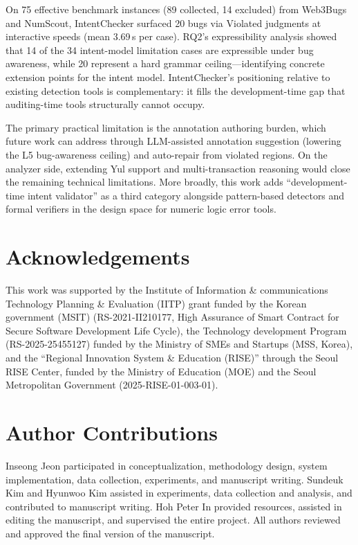 \documentclass[pdflatex,sn-basic]{sn-jnl}%
\theoremstyle{thmstyleone}%
\theoremstyle{thmstyletwo}%
\theoremstyle{thmstylethree}%
\begin{document}
On 75 effective benchmark instances (89 collected, 14 excluded) from Web3Bugs and NumScout, IntentChecker surfaced 20 bugs via Violated judgments at interactive speeds (mean 3.69\,s per case).
RQ2's expressibility analysis showed that 14 of the 34 intent-model limitation cases are expressible under bug awareness, while 20 represent a hard grammar ceiling---identifying concrete extension points for the intent model.
IntentChecker's positioning relative to existing detection tools is complementary: it fills the development-time gap that auditing-time tools structurally cannot occupy.

The primary practical limitation is the annotation authoring burden, which future work can address through LLM-assisted annotation suggestion (lowering the L5 bug-awareness ceiling) and auto-repair from violated regions.
On the analyzer side, extending Yul support and multi-transaction reasoning would close the remaining technical limitations.
More broadly, this work adds ``development-time intent validator'' as a third category alongside pattern-based detectors and formal verifiers in the design space for numeric logic error tools.

\section*{Acknowledgements}
This work was supported by the Institute of Information \& communications Technology Planning \& Evaluation (IITP) grant funded by the Korean government (MSIT) (RS-2021-II210177, High Assurance of Smart Contract for Secure Software Development Life Cycle), the Technology development Program (RS-2025-25455127) funded by the Ministry of SMEs and Startups (MSS, Korea), and the ``Regional Innovation System \& Education (RISE)'' through the Seoul RISE Center, funded by the Ministry of Education (MOE) and the Seoul Metropolitan Government (2025-RISE-01-003-01).

\section*{Author Contributions}
Inseong Jeon participated in conceptualization, methodology design, system implementation, data collection, experiments, and manuscript writing. Sundeuk Kim and Hyunwoo Kim assisted in experiments, data collection and analysis, and contributed to manuscript writing. Hoh Peter In provided resources, assisted in editing the manuscript, and supervised the entire project. All authors reviewed and approved the final version of the manuscript.
\end{document}
